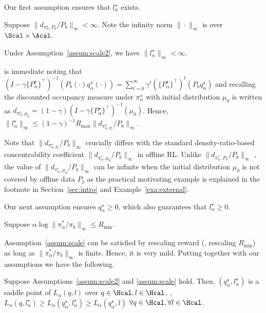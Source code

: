 Our first assumption ensures that $l_\alpha^\star$ exists. 
\begin{assum}\label{assum:scale2}
Suppose $\|d_{\pi^{\star}_{\alpha},P_b}/P_b\|_{\infty}<\infty$. {Note the infinity norm $\|\cdot\|_{\infty}$ is over $\Scal \times \Acal$.}  
\end{assum}
\begin{proposition}\label{prop:scale2}
Under Assumption~\ref{assum:scale2}, we have
$\|l^{\star}_{\alpha}\|_{\infty} < \infty$.

\end{proposition}
 is immediate noting that $(I-\gamma \{P^{\star}_{\alpha}\}^{\top})^{-1}(P_b(\cdot)q^{\star}_{\alpha}(\cdot))=\sum_{t=0}^{\infty}\gamma^t (\{P^{\star}_{\alpha}\}^{\top})^t  (P_bq^{\star}_{\alpha})$ and
recalling the discounted occupancy measure under $\pi^{\star}_{\alpha}$ with initial distribution $\mu_0$ is written as $d_{\pi^{\star}_{\alpha},\mu_0} = (1-\gamma)(I-\gamma \{P^{\star}_{\alpha}\}^{\top})^{-1}(\mu_0)$. Hence, $\|l^{\star}_{\alpha}\|_{\infty}\leq (1-\gamma)^{-1}R_{\max}\|d_{\pi^{\star}_{\alpha,P_b}}/P_b\|_{\infty}$.

{\finaledit Note that $\|d_{\pi^{\star}_{\alpha,P_b}}/P_b\|_{\infty}$ crucially differs with the standard density-ratio-based concentrability coefficient  $\|d_{\pi^{*}_{\alpha},\mu_0}/P_b\|_{\infty}$ in offline RL. 
{\newedit Unlike $\|d_{\pi^{*}_{\alpha},P_b}/P_b\|_{\infty}$ , the value of $\|d_{\pi^{*}_{\alpha},\mu_0}/P_b\|_{\infty}$ can be infinite when the initial distribution $\mu_0$ is not covered by offline data $P_b$
 as the practical motivating example is explained in the footnote in Section~\ref{sec:intro} and Example~\ref{exa:external}. 
}} 


Our next assumption ensures $q^{\star}_{\alpha}\geq 0$, which also guarantees that $l^{\star}_{\alpha}\geq 0$.
\begin{assum}\label{assum:scale}
Suppose $\alpha\log\|\pi^{*}_{\alpha}/\pi_b\|_{\infty}\leq R_{\min}$. %
\end{assum}
Assumption~\ref{assum:scale} can be satisfied by rescaling reward (\ie, rescaling $R_{\min}$) as long as $\|\pi^{*}_{\alpha}/\pi_b\|_{\infty}$ is finite. Hence, it is very mild.   Putting  together with our assumptions we have the following.






\begin{lemma}\label{lem:saddle}
Suppose Assumptions~\ref{assum:scale2} and  \ref{assum:scale} hold. Then, $(q^{\star}_{\alpha}, l^{\star}_{\alpha})$ is a saddle point of   $L_{\alpha}(q,l)$ over $q\in \Hcal,l\in \Hcal$, \ie, $
  L_{\alpha}(q,l^{\star}_{\alpha}) \geq L_{\alpha}(q^{\star}_{\alpha},l^{\star}_{\alpha}) \geq L_{\alpha}(q^{\star}_{\alpha},l)$ $\forall q\in \Hcal, \forall l\in \Hcal$.
\end{lemma}


